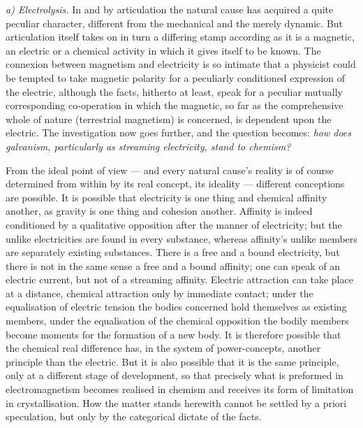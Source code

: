 \documentclass[12pt,a4paper]{book}
\newcommand{\runin}[1]{\emph{#1}\hspace{0.4em}}
\begin{document}
\runin{a) Electrolysis.} In and by articulation the natural cause has acquired a quite peculiar character, different from
the mechanical and the merely dynamic. But articulation itself takes on in turn a differing stamp according as it is a
magnetic, an electric or a chemical activity in which it gives itself to be known. The connexion between magnetism and
electricity is so intimate that a physicist could be tempted to take magnetic polarity for a peculiarly conditioned
expression of the electric, although the facts, hitherto at least, speak for a peculiar mutually corresponding
co-operation in which the magnetic, so far as the comprehensive whole of nature (terrestrial magnetism) is concerned, is
dependent
upon the electric. The investigation now goes further, and the question becomes:
\emph{how does galvanism, particularly as streaming electricity, stand to chemism?}

From the ideal point of view --- and every natural cause's reality is of course determined from within by its real
concept, its ideality --- different conceptions are possible. It is possible that electricity is one thing and chemical
affinity another, as gravity is one thing and cohesion another. Affinity is indeed conditioned by a qualitative
opposition after the manner of electricity; but the unlike electricities are found in every substance, whereas affinity's
unlike members are separately existing substances. There is a free and a bound electricity, but there is not in the same
sense a free and a bound affinity; one can speak of an electric current, but not of a streaming affinity. Electric
attraction can take place at a distance, chemical attraction only by immediate contact; under the equalisation of
electric tension the bodies concerned hold themselves as existing members, under the equalisation of the chemical
opposition the bodily members become moments for the formation of a new body. It is therefore possible that the chemical
real difference has, in the system of power-concepts, another principle than the electric. But it is also possible that
it is the same principle, only at a different stage of development, so that precisely what is preformed in
electromagnetism becomes realised in chemism and receives its form of limitation in crystallisation. How the matter
stands herewith cannot be settled by a priori speculation, but only by the categorical dictate of the facts.
\end{document}

